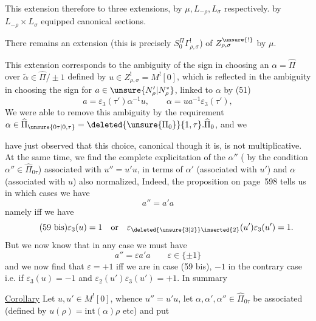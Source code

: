 
This extension  therefore  to three extensions, by $\mu,L_{-\rho},L_\sigma$ respectively.   by $L_{-\rho}\times L_\sigma$  equipped  canonical sections.

There remains an extension (this is precisely $S_0^\Pi\Gamma^!_{\rho,\sigma}$) of $Z^{\unsure{!}}_{\rho,\sigma}$ by $\mu$.

This extension corresponds  to the ambiguity of the sign in choosing an $\alpha=\widehat\Pi$ over $\widetilde\alpha\in\widehat\Pi/\pm1$ defined by $u\in Z^!_{\rho,\sigma}=M^![0]$, which is reflected in the ambiguity in choosing the sign for $a\in\unsure{N'_\rho|N_\rho^*}$, linked to $\alpha$ by (51)
\[
\tag{58}
a=\varepsilon_3(\tau')\alpha^{-1}u,
\qquad \alpha=ua^{-1}\varepsilon_3(\tau'),
\]
We were able to remove this ambiguity by the requirement
$\alpha\in\widehat\Pi_{\unsure{0\tau|0,\tau}}=\deleted{\unsure{\Pi_0}}\{1,\tau\}.\widehat\Pi_0$, and we



have just observed that this choice, canonical though it is, is not multiplicative. At the same time, we find the complete explicitation of the $\alpha''$ (  by the condition $\alpha''\in\widehat\Pi_{0\tau}$) associated with $u''=u'u$, in terms of $\alpha'$ (associated with $u'$) and $\alpha$ (associated with $u$) also normalized,  Indeed, the proposition on page\ 598 tells us in which cases  we have
\[
\tag{59} a''=a'a
\]
namely iff we have
\[
\tag{59 bis}
\varepsilon_3(u)=1\quad\text{or}\quad
\varepsilon_{\deleted{\unsure{3|2}}\inserted{2}}(u')\varepsilon_3(u')=1.
\]
But we now know that in any case we must have
\[
\tag{60}
a''=\varepsilon a'a\qquad \varepsilon\in\{\pm1\}
\]
and we now find that $\varepsilon=+1$ iff we are in case (59 bis), $-1$ in the contrary case i.e. if $\varepsilon_3(u)=-1$ and $\varepsilon_2(u')\varepsilon_3(u')=+1$. In summary

\uline{Corollary} Let $u,u'\in M^![0]$, whence $u''=u'u$, let $\alpha,\alpha',\alpha''\in\widehat\Pi_{0\tau}$ be associated (defined by $u(\rho)=\mathrm{int}(\alpha)\rho$ etc) and put


